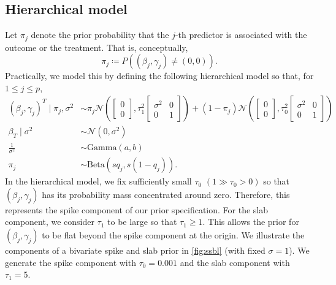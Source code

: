 \documentclass{amsart}
\newcommand{\normal}{\mathcal{N}}
\begin{document}
\subsection{Hierarchical model}

Let $\pi_j$ denote the prior probability that the $j$-th
predictor is associated with the outcome or the 
treatment. That is, conceptually,
\begin{equation}
	\pi_j \coloneqq P\left((\beta_j,\gamma_j)\not=(0,0)\right).
\end{equation}
Practically, we model this by defining the following hierarchical model
so that,
for $1\le j\le p$,
\begin{align}
	(\beta_j,\gamma_j)^T \mid \pi_{j}, \sigma^2 &\sim 
	\pi_{j}\normal\left( \begin{bmatrix}
		0 \\
		0
	\end{bmatrix}, 
	\tau_1^2\begin{bmatrix}
		\sigma^2 & 0 \\
		0 & 1
	\end{bmatrix}\right)
	+ (1-\pi_{j}) \normal\left(\begin{bmatrix}
		0 \\
		0
	\end{bmatrix}, 
	\tau_0^2\begin{bmatrix}
		\sigma^2 & 0 \\
		0 & 1
	\end{bmatrix}\right)\\
	\beta_T\mid \sigma^2 &\sim \normal\left(0, \sigma^2\right)\\
        \frac{1}{\sigma^2}&\sim \text{Gamma}(a, b)\\
	\pi_{j} &\sim\text{Beta}\left(sq_j, s(1-q_j)\right).
\end{align}
In the hierarchical model, we fix sufficiently small $\tau_0$
$(1\gg\tau_0>0)$ so that  $(\beta_j, \gamma_j)$ has its probability mass 
concentrated around zero. Therefore, this represents the spike component of our prior specification. 
For the slab component, we consider $\tau_1$ to be large so that $\tau_1\ge 1$. This allows the prior for $(\beta_j,\gamma_j)$ to be flat beyond the spike component at the origin. 
We illustrate the components of a bivariate spike and slab prior in 
\cref{fig:ssbl} (with fixed $\sigma=1$). We generate the spike component 
with $\tau_0=0.001$ and the slab component with $\tau_1=5$.
\end{document}

